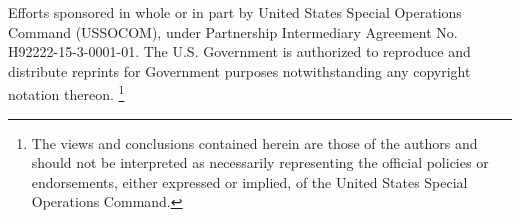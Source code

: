 \documentclass[final,5p,times, twocolumn]{elsarticle}
\begin{document}
	Efforts sponsored in whole or in part by United States Special Operations Command (USSOCOM), under Partnership Intermediary Agreement No. H92222-15-3-0001-01. The U.S. Government is authorized to reproduce and distribute reprints for Government purposes notwithstanding any copyright notation thereon.  
	{\footnote{ The views and conclusions contained herein are those of the authors and should not be interpreted as necessarily representing the official policies or endorsements, either expressed or implied, of the United States Special Operations Command.} }
	
	
	{}
	
		
	
	
	
\end{document}
